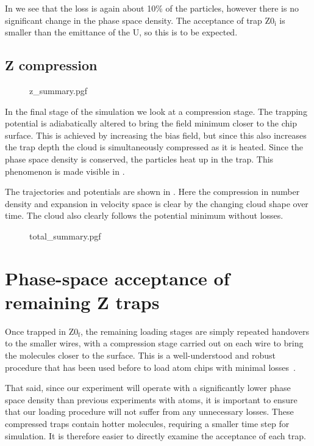 In  we see that the loss is again about 10\% of
the particles, however there is no significant change in the phase space
density. The acceptance of trap $\mathrm{Z0_i}$ is smaller than the emittance
of the U, so this is to be expected.

\subsection{Z compression}
\begin{figure}[p]
\centering
  {z_summary.pgf}
  \caption{
  }
  \label{design:fig:mttusum}
\end{figure}


In the final stage of the simulation we look at a compression stage. The
trapping potential is adiabatically altered to bring the field minimum closer
to the chip surface. This is achieved by increasing the bias field, but since
this also increases the trap depth the cloud is simultaneously compressed as it
is heated. Since the phase space density is conserved, the particles heat up in
the trap. This phenomenon is made visible in
.

The trajectories and potentials are shown in .
Here the compression in number density and expansion in velocity space is clear
by the changing cloud shape over time. The cloud also clearly follows the
potential minimum without losses.

\begin{figure}[p]
\centering
  {total_summary.pgf}
  \caption{
  }
  \label{design:fig:mttusum}
\end{figure}


\section{Phase-space acceptance of remaining Z traps}
\label{design:transferbetweenzs}


Once trapped in $\mathrm{Z0_f}$, the remaining loading stages are simply
repeated handovers to the smaller wires, with a compression stage carried out
on each wire to bring the molecules closer to the surface. This is a
well-understood and robust procedure that has been used before to load atom
chips with minimal losses~\cite{Reichel2002}.

That said, since our experiment will operate with a significantly lower phase
space density than previous experiments with atoms, it is important to ensure
that our loading procedure will not suffer from any unnecessary losses. These
compressed traps contain hotter molecules, requiring a smaller time step for
simulation. It is therefore easier to directly examine the acceptance of each
trap.

